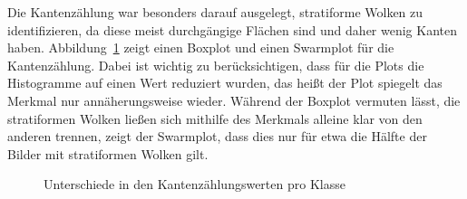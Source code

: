 \documentclass[a4,german]{article}
\begin{document}
Die Kantenzählung war besonders darauf ausgelegt, stratiforme Wolken %
zu identifizieren, da diese meist durchgängige Flächen sind und daher wenig Kanten haben.
Abbildung~\ref{fig:kbs} zeigt einen Boxplot und einen Swarmplot für die Kantenzählung.
Dabei ist wichtig zu berücksichtigen, dass für die Plots die Histogramme auf einen Wert reduziert wurden, das heißt der Plot spiegelt das Merkmal nur annäherungsweise wieder.
Während der Boxplot vermuten lässt, die stratiformen Wolken ließen sich mithilfe des Merkmals alleine klar von den anderen trennen, zeigt der Swarmplot, dass dies nur für etwa die Hälfte der Bilder mit stratiformen Wolken gilt. %

\begin{figure}[h!]%
\caption{Unterschiede in den Kantenzählungswerten pro Klasse}
    \label{fig:kbs}
\end{figure}
\end{document}

